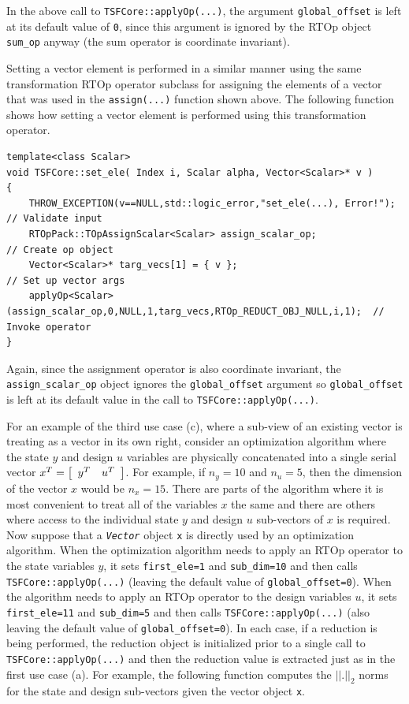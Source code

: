 \noindent In the above call to \texttt{TSFCore::applyOp(\-...)}, the argument
\texttt{global\_offset} is left at its default value of \texttt{0},
since this argument is ignored by the RTOp object \texttt{sum\_op}
anyway (the sum operator is coordinate invariant).

Setting a vector element is performed in a similar manner using the
same transformation RTOp operator subclass for assigning the elements
of a vector that was used in the \texttt{assign(...)} function shown
above.  The following function shows how setting a vector element
is performed using this transformation operator.

{\scriptsize\begin{verbatim}
template<class Scalar>
void TSFCore::set_ele( Index i, Scalar alpha, Vector<Scalar>* v )
{
    THROW_EXCEPTION(v==NULL,std::logic_error,"set_ele(...), Error!");               // Validate input
    RTOpPack::TOpAssignScalar<Scalar> assign_scalar_op;                             // Create op object
    Vector<Scalar>* targ_vecs[1] = { v };                                           // Set up vector args
    applyOp<Scalar>(assign_scalar_op,0,NULL,1,targ_vecs,RTOp_REDUCT_OBJ_NULL,i,1);  // Invoke operator
}
\end{verbatim}}

\noindent Again, since the assignment operator is also coordinate invariant, the
\texttt{assign\_scalar\_op} object ignores the \texttt{global\_offset}
argument so \texttt{global\_offset} is left at its default value in
the call to \texttt{TSFCore::applyOp(\-...)}.

For an example of the third use case (c), where a sub-view of an
existing vector is treating as a vector in its own right, consider an
optimization algorithm where the state $y$ and design $u$ variables
are physically concatenated into a single serial vector $x^T =
{\bmat{cc} y^T & u^T \emat}$.  For example, if $n_y = 10$ and $n_u =
5$, then the dimension of the vector $x$ would be $n_x = 15$.  There
are parts of the algorithm where it is most convenient to treat all of
the variables $x$ the same and there are others where access to the
individual state $y$ and design $u$ sub-vectors of $x$ is required.
Now suppose that a \texttt{\textit{Vector}} object \texttt{x} is
directly used by an optimization algorithm.  When the optimization
algorithm needs to apply an RTOp operator to the state variables $y$, it
sets \texttt{first\_ele=1} and \texttt{sub\_dim=10} and then calls
\texttt{TSFCore::applyOp(\-...)} (leaving the default value of
\texttt{global\_offset=0}).  When the algorithm needs to apply an
RTOp operator to the design variables $u$, it sets
\texttt{first\_ele=11} and \texttt{sub\_dim=5} and then calls
\texttt{TSFCore::applyOp(\-...)} (also leaving the default value of
\texttt{global\_offset=0}).  In each case, if a reduction is being performed,
the reduction object is initialized prior to a single call to
\texttt{TSFCore::applyOp(\-...)} and then the reduction value is extracted
just as in the first use case (a).  For example, the following
function computes the $||.||_2$ norms for the state and design
sub-vectors given the vector object \texttt{x}.

